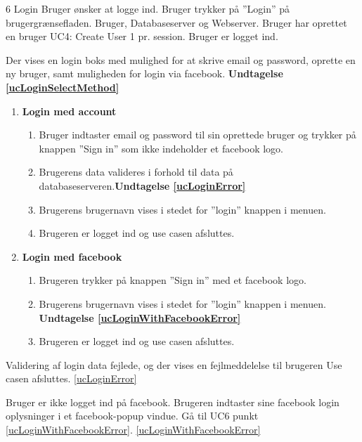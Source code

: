 
\uchead
	{6}
	{Login}
	{Bruger ønsker at logge ind.}
	{Bruger trykker på ''Login'' på brugergrænsefladen.}
	{Bruger, Databaseserver og Webserver.}
	{Bruger har oprettet en bruger} %
	{UC4: Create User}
	{1 pr. session.}
	{Bruger er logget ind.}	
  
		
\item Der vises en login boks med mulighed for at skrive email og password, oprette en ny bruger, samt muligheden for login via facebook. \textbf{Undtagelse \ref{ucLoginSelectMethod}}

\begin{enumerate}

\item \textbf{Login med account}

	\begin{enumerate}
		\item Bruger indtaster email og password til sin oprettede bruger og trykker på knappen ''Sign in'' som ikke indeholder et facebook logo.
		\item \label{ucLoginError}Brugerens data valideres i forhold til data på databaseserveren.\textbf{Undtagelse \ref{ucLoginError}}
		\item Brugerens brugernavn vises i stedet for ''login'' knappen i menuen.
		\item Brugeren er logget ind og use casen afsluttes.
	\end{enumerate}
	
\item \textbf{Login med facebook}
	
	\begin{enumerate}
		\item Brugeren trykker på knappen ''Sign in'' med et facebook logo.
		\item\label{ucLoginWithFacebookError} Brugerens brugernavn vises i stedet for ''login'' knappen i menuen. \textbf{Undtagelse \ref{ucLoginWithFacebookError}}
		\item Brugeren er logget ind og use casen afsluttes.
				
	\end{enumerate}
\end{enumerate}

\ucdescriptionend %
	\ucextension
	{Validering af login data fejlede, og der vises en fejlmeddelelse til brugeren }
	{Use casen afsluttes.}
	{\ref{ucLoginError}}

\ucextension
	{Bruger er ikke logget ind på facebook. Brugeren indtaster sine facebook login oplysninger i et facebook-popup vindue.}
	{Gå til UC6 punkt \ref{ucLoginWithFacebookError}.}
	{\ref{ucLoginWithFacebookError}}


